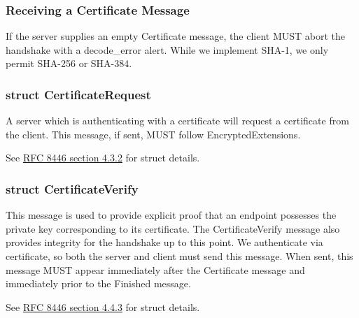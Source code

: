 \documentclass{article}
\begin{document}
\subsubsection{Receiving a Certificate Message}
If the server supplies an empty Certificate message, the client MUST abort the handshake with a decode\_error alert.
While we implement SHA-1, we only permit SHA-256 or SHA-384.

\subsubsection{struct CertificateRequest}
A server which is authenticating with a certificate will request a certificate from the client.
This message, if sent, MUST follow EncryptedExtensions.

See \href{https://datatracker.ietf.org/doc/html/rfc8446#section-4.3.2}{RFC 8446 section 4.3.2\tiny\faExternalLink} for struct details.


\subsubsection{struct CertificateVerify}
This message is used to provide explicit proof that an endpoint possesses the private key corresponding to its certificate.
The CertificateVerify message also provides integrity for the handshake up to this point.
We authenticate via certificate, so both the server and client must send this message.
When sent, this message MUST appear immediately after the Certificate message and immediately prior to the Finished message.

See \href{https://datatracker.ietf.org/doc/html/rfc8446#section-4.4.3}{RFC 8446 section 4.4.3\tiny\faExternalLink} for struct details.
\end{document}
